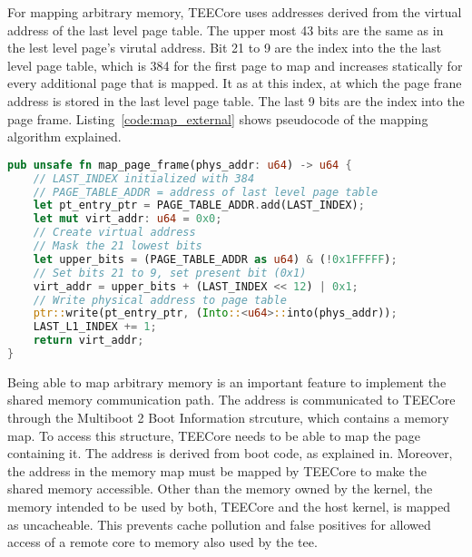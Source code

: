 For mapping arbitrary memory, TEECore uses addresses derived from the virtual
address of the last level page table. The upper most 43 bits are the same as in
the lest level page's virutal address. Bit 21 to 9 are the index into the the
last level page table, which is 384 for the first page to map and increases
statically for every additional page that is mapped. It as at this index, at
which the page frane address is stored in the last level page table. The last 9
bits are the index into the page frame. Listing~\ref{code:map_external} shows
pseudocode of the mapping algorithm explained.

\begin{lstlisting}[language=Rust, caption=Mapping of external memory, label=code:map_external]
pub unsafe fn map_page_frame(phys_addr: u64) -> u64 {
    // LAST_INDEX initialized with 384
    // PAGE_TABLE_ADDR = address of last level page table
    let pt_entry_ptr = PAGE_TABLE_ADDR.add(LAST_INDEX);
    let mut virt_addr: u64 = 0x0;
    // Create virtual address
    // Mask the 21 lowest bits
    let upper_bits = (PAGE_TABLE_ADDR as u64) & (!0x1FFFFF);
    // Set bits 21 to 9, set present bit (0x1)
    virt_addr = upper_bits + (LAST_INDEX << 12) | 0x1;
    // Write physical address to page table
    ptr::write(pt_entry_ptr, (Into::<u64>::into(phys_addr));
    LAST_L1_INDEX += 1;
    return virt_addr;
}
\end{lstlisting}

Being able to map arbitrary memory is an important feature to implement the
shared memory communication path. The address is communicated to TEECore through
the Multiboot 2 Boot Information strcuture, which contains a memory map. To
access this structure, TEECore needs to be able to map the page containing it.
The address is derived from boot code, as explained in. Moreover, the address in the memory map must be mapped by TEECore to
make the shared memory accessible. Other than the memory owned by the kernel,
the memory intended to be used by both, TEECore and the host kernel, is mapped
as uncacheable. This prevents cache pollution and false positives for allowed
access of a remote core to memory also used by the \gls{tee}.\\

